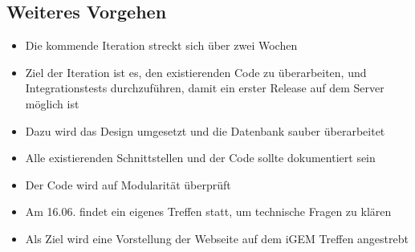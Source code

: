 \documentclass[colorback, accentcolor=tud1c, paper=a4]{tudexercise}
\begin{document}
\begin{multicols}{2}
		\subsection*{Weiteres Vorgehen}
		\begin{itemize}
			\item Die kommende Iteration streckt sich über zwei Wochen
			\item Ziel der Iteration ist es, den existierenden Code zu überarbeiten, und Integrationstests durchzuführen, damit ein erster Release auf dem Server möglich ist
			\item Dazu wird das Design umgesetzt und die Datenbank sauber überarbeitet
			\item Alle existierenden Schnittstellen und der Code sollte dokumentiert sein
			\item Der Code wird auf Modularität überprüft
			\item Am 16.06. findet ein eigenes Treffen statt, um technische Fragen zu klären
			\item Als Ziel wird eine Vorstellung der Webseite auf dem iGEM Treffen angestrebt
		\end{itemize}

	\end{multicols}
	
\end{document}

